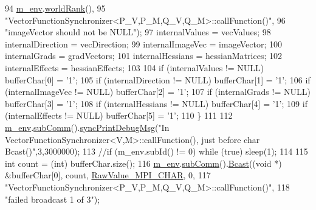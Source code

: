 \begin{DoxyCode}
94                             \hyperlink{class_q_u_e_s_o_1_1_vector_function_synchronizer_a36c2a9e1a2d317dddb5cf51b68e5c659}{m\_env}.\hyperlink{class_q_u_e_s_o_1_1_base_environment_a78b57112bbd0e6dd0e8afec00b40ffa7}{worldRank}(),
95                             \textcolor{stringliteral}{"VectorFunctionSynchronizer<P\_V,P\_M,Q\_V,Q\_M>::callFunction()"},
96                             \textcolor{stringliteral}{"imageVector should not be NULL"});
97         internalValues    = vecValues;
98         internalDirection = vecDirection;
99         internalImageVec  = imageVector;
100         internalGrads     = gradVectors;
101         internalHessians  = hessianMatrices;
102         internalEffects   = hessianEffects;
103 
104         \textcolor{keywordflow}{if} (internalValues    != NULL) bufferChar[0] = \textcolor{charliteral}{'1'};
105         \textcolor{keywordflow}{if} (internalDirection != NULL) bufferChar[1] = \textcolor{charliteral}{'1'};
106         \textcolor{keywordflow}{if} (internalImageVec  != NULL) bufferChar[2] = \textcolor{charliteral}{'1'};
107         \textcolor{keywordflow}{if} (internalGrads     != NULL) bufferChar[3] = \textcolor{charliteral}{'1'};
108         \textcolor{keywordflow}{if} (internalHessians  != NULL) bufferChar[4] = \textcolor{charliteral}{'1'};
109         \textcolor{keywordflow}{if} (internalEffects   != NULL) bufferChar[5] = \textcolor{charliteral}{'1'};
110       \}
111 
112       \hyperlink{class_q_u_e_s_o_1_1_vector_function_synchronizer_a36c2a9e1a2d317dddb5cf51b68e5c659}{m\_env}.\hyperlink{class_q_u_e_s_o_1_1_base_environment_affe39f53e3d5d678842413370af09145}{subComm}().\hyperlink{class_q_u_e_s_o_1_1_mpi_comm_a6f73891de4668c325277ddaa799cf808}{syncPrintDebugMsg}(\textcolor{stringliteral}{"In
       VectorFunctionSynchronizer<V,M>::callFunction(), just before char Bcast()"},3,3000000);
113       \textcolor{comment}{//if (m\_env.subId() != 0) while (true) sleep(1);}
114 
115       \textcolor{keywordtype}{int} count = (int) bufferChar.size();
116       \hyperlink{class_q_u_e_s_o_1_1_vector_function_synchronizer_a36c2a9e1a2d317dddb5cf51b68e5c659}{m\_env}.\hyperlink{class_q_u_e_s_o_1_1_base_environment_affe39f53e3d5d678842413370af09145}{subComm}().\hyperlink{class_q_u_e_s_o_1_1_mpi_comm_abd6af8db8b0c7fd2f5b62e26477a9537}{Bcast}((\textcolor{keywordtype}{void} *) &bufferChar[0], count, 
      \hyperlink{_mpi_comm_8h_ae81a57f3cac29c0f9c656182d95b8af1}{RawValue\_MPI\_CHAR}, 0,
117                             \textcolor{stringliteral}{"VectorFunctionSynchronizer<P\_V,P\_M,Q\_V,Q\_M>::callFunction()"},
118                             \textcolor{stringliteral}{"failed broadcast 1 of 3"});

\end{DoxyCode}

